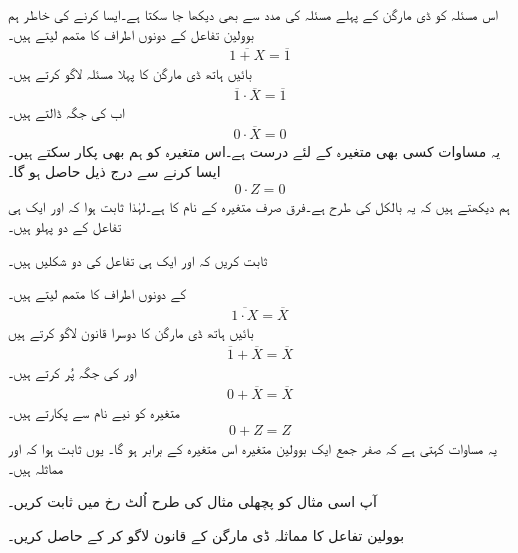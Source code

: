 اس مسئلہ کو ڈی مارگن کے پہلے مسئلہ کی مدد سے بھی دیکھا جا سکتا ہے۔ایسا کرنے کی خاطر ہم بوولین تفاعل  کے دونوں اطراف کا متمم لیتے ہیں۔
\begin{align*}
\overline{1+X}=\overline{1}
\end{align*}
بائیں ہاتھ ڈی مارگن کا پہلا مسئلہ لاگو کرتے ہیں۔
\begin{align*}
\overline{1}\cdot \overline{X}=\overline{1}
\end{align*}
اب  کی جگہ  ڈالتے ہیں۔
\begin{align*}
0\cdot \overline{X}=0
\end{align*}
یہ مساوات کسی بھی متغیرہ  کے لئے درست ہے۔اس متغیرہ کو ہم بھی پکار سکتے ہیں۔ ایسا کرنے سے درج ذیل حاصل ہو گا۔
\begin{align*}
0\cdot Z=0
\end{align*}
ہم دیکھتے ہیں کہ یہ بالکل  کی طرح ہے۔فرق صرف متغیرہ کے نام کا ہے۔لہٰذا ثابت ہوا کہ  اور  ایک ہی تفاعل کے دو پہلو ہیں۔

ثابت کریں کہ  اور  ایک ہی تفاعل کی دو شکلیں ہیں۔

\quad
{}	کے دونوں اطراف کا متمم لیتے ہیں۔
\begin{align*}
\overline{1\cdot X}=\overline{X}
\end{align*}
بائیں ہاتھ ڈی مارگن کا دوسرا قانون لاگو کرتے ہیں
\begin{align*}
\overline{1}+\overline{X}=\overline{X}
\end{align*}
اور  کی جگہ  پُر کرتے ہیں۔
\begin{align*}
0+\overline{X}=\overline{X}
\end{align*}
متغیرہ  کو نیے نام  سے پکارتے ہیں۔
\begin{align*}
0+Z=Z
\end{align*}
یہ مساوات کہتی ہے کہ صفر جمع ایک بوولین متغیرہ اس متغیرہ کے برابر ہو گا۔ یوں ثابت ہوا کہ  اور  مماثلہ ہیں۔

آپ اسی مثال کو پچھلی مثال کی طرح اُلٹ رخ میں ثابت کریں۔

 بوولین تفاعل  کا مماثلہ ڈی مارگن کے قانون لاگو کر کے حاصل کریں۔

